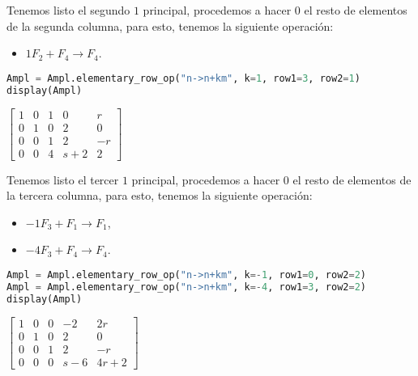 \documentclass[12pt,a4]{aleph-examen}
\begin{document}
\begin{preguntas}
\begin{respuesta}
Tenemos listo el segundo \(1\) principal, procedemos a hacer \(0\) el
resto de elementos de la segunda columna, para esto, tenemos la
siguiente operación: 
\begin{itemize}
    \item \(1F_2+F_4\to F_4\).
\end{itemize}
\begin{pycodigo}
    \begin{ipynbcodigo}\begin{lstlisting}[language=Python]
Ampl = Ampl.elementary_row_op("n->n+km", k=1, row1=3, row2=1)
display(Ampl)
    \end{lstlisting}\end{ipynbcodigo}
    \begin{ipynbsalida}[2mm]
    $\displaystyle \left[\begin{matrix}1 & 0 & 1 & 0 & r\\0 & 1 & 0 & 2 & 0\\0 & 0 & 1 & 2 & - r\\0 & 0 & 4 & s + 2 & 2\end{matrix}\right]$
    \end{ipynbsalida}
\end{pycodigo}

Tenemos listo el tercer \(1\) principal, procedemos a hacer \(0\) el
resto de elementos de la tercera columna, para esto, tenemos la
siguiente operación: 
\begin{itemize}
    \item \(-1F_3+F_1\to F_1\),
    \item \(-4F_3+F_4\to F_4\).
\end{itemize}
\begin{pycodigo}
    \begin{ipynbcodigo}\begin{lstlisting}[language=Python]
Ampl = Ampl.elementary_row_op("n->n+km", k=-1, row1=0, row2=2)
Ampl = Ampl.elementary_row_op("n->n+km", k=-4, row1=3, row2=2)
display(Ampl)
    \end{lstlisting}\end{ipynbcodigo}
    \begin{ipynbsalida}[2mm]
    $\displaystyle \left[\begin{matrix}1 & 0 & 0 & -2 & 2 r\\0 & 1 & 0 & 2 & 0\\0 & 0 & 1 & 2 & - r\\0 & 0 & 0 & s - 6 & 4 r + 2\end{matrix}\right]$
    \end{ipynbsalida}
\end{pycodigo}


\end{respuesta}
\end{preguntas}
\end{document}

